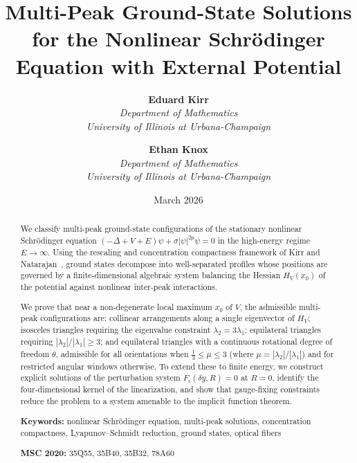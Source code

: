 \documentclass[11pt]{article}
\theoremstyle{plain}%
\theoremstyle{definition}%
\theoremstyle{definition}%
\theoremstyle{remark}%
\numberwithin{equation}{section}
\newcommand{\HV}{H_V}
\begin{document}
\title{\textbf{Multi-Peak Ground-State Solutions for the Nonlinear Schr\"odinger Equation with External Potential}}
\author{
  \textbf{Eduard Kirr}\\
  \textit{Department of Mathematics}\\
  \textit{University of Illinois at Urbana-Champaign}
  \and
  \textbf{Ethan Knox}\\
  \textit{Department of Mathematics}\\
  \textit{University of Illinois at Urbana-Champaign}
}
\date{March 2026}
\maketitle

\begin{abstract}
We classify multi-peak ground-state configurations of the stationary nonlinear Schr\"odinger equation $(-\Delta+V+E)\psi+\sigma|\psi|^{2p}\psi=0$ in the high-energy regime $E\to\infty$. Using the rescaling and concentration compactness framework of Kirr and Natarajan~\cite{KirrNatarajan2018}, ground states decompose into well-separated profiles whose positions are governed by a finite-dimensional algebraic system balancing the Hessian $\HV(x_0)$ of the potential against nonlinear inter-peak interactions.

We prove that near a non-degenerate local maximum $x_0$ of $V$, the admissible multi-peak configurations are: collinear arrangements along a single eigenvector of $\HV$; isosceles triangles requiring the eigenvalue constraint $\lambda_2=3\lambda_1$; equilateral triangles requiring $|\lambda_2|/|\lambda_1|\geq 3$; and equilateral triangles with a continuous rotational degree of freedom $\theta$, admissible for all orientations when $\tfrac{1}{3}\leq\mu\leq 3$ (where $\mu=|\lambda_2|/|\lambda_1|$) and for restricted angular windows otherwise. To extend these to finite energy, we construct explicit solutions of the perturbation system $F_i(\delta y,R)=0$ at $R=0$, identify the four-dimensional kernel of the linearization, and show that gauge-fixing constraints reduce the problem to a system amenable to the implicit function theorem.

\medskip\noindent
\textbf{Keywords:} nonlinear Schr\"odinger equation, multi-peak solutions, concentration compactness, Lyapunov--Schmidt reduction, ground states, optical fibers

\medskip\noindent
\textbf{MSC 2020:} 35Q55, 35B40, 35B32, 78A60
\end{abstract}
\end{document}
